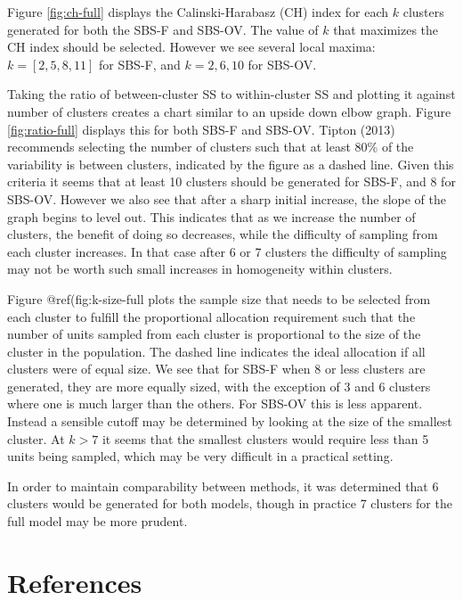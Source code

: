 \documentclass[man]{apa6}
\begin{document}
Figure \ref{fig:ch-full} displays the Calinski-Harabasz (CH) index for each \(k\) clusters generated for both the SBS-F and SBS-OV. The value of \(k\) that maximizes the CH index should be selected. However we see several local maxima: \(k = [2, 5, 8, 11]\) for SBS-F, and \(k = 2, 6, 10\) for SBS-OV.

Taking the ratio of between-cluster SS to within-cluster SS and plotting it against number of clusters creates a chart similar to an upside down elbow graph. Figure \ref{fig:ratio-full} displays this for both SBS-F and SBS-OV. Tipton (2013) recommends selecting the number of clusters such that at least 80\% of the variability is between clusters, indicated by the figure as a dashed line. Given this criteria it seems that at least 10 clusters should be generated for SBS-F, and 8 for SBS-OV. However we also see that after a sharp initial increase, the slope of the graph begins to level out. This indicates that as we increase the number of clusters, the benefit of doing so decreases, while the difficulty of sampling from each cluster increases. In that case after 6 or 7 clusters the difficulty of sampling may not be worth such small increases in homogeneity within clusters.

Figure @ref(fig:k-size-full plots the sample size that needs to be selected from each cluster to fulfill the proportional allocation requirement such that the number of units sampled from each cluster is proportional to the size of the cluster in the population. The dashed line indicates the ideal allocation if all clusters were of equal size. We see that for SBS-F when 8 or less clusters are generated, they are more equally sized, with the exception of 3 and 6 clusters where one is much larger than the others. For SBS-OV this is less apparent. Instead a sensible cutoff may be determined by looking at the size of the smallest cluster. At \(k > 7\) it seems that the smallest clusters would require less than 5 units being sampled, which may be very difficult in a practical setting.

In order to maintain comparability between methods, it was determined that 6 clusters would be generated for both models, though in practice 7 clusters for the full model may be more prudent.

\newpage

\hypertarget{references}{%
\section{References}\label{references}}
\end{document}
